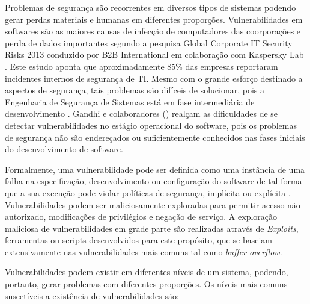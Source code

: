 %

Problemas de segurança são recorrentes em diversos tipos de sistemas podendo gerar perdas materiais e humanas em diferentes proporções. Vulnerabilidades em softwares são as maiores causas de infecção de computadores das coorporações e perda de dados importantes segundo a pesquisa Global Corporate IT Security Risks 2013 conduzido por B2B International em colaboração com Kaspersky Lab \cite{b2binternational2013}. Este estudo aponta que aproximadamente 85\% das empresas reportaram incidentes internos de segurança de TI. Mesmo com o grande esforço destinado a aspectos de segurança, tais problemas são difíceis de solucionar, pois a Engenharia de Segurança de Sistemas está em fase intermediária de desenvolvimento \cite{pascoa2002}. Gandhi e colaboradores (\citeyear{gandhi2013}) realçam as dificuldades de se detectar vulnerabilidades no estágio operacional do software, pois os problemas de segurança não são endereçados ou suficientemente conhecidos nas fases iniciais do desenvolvimento de software. 

%

Formalmente, uma vulnerabilidade pode ser definida como uma instância de uma falha na especificação, desenvolvimento ou configuração do software de tal forma que a sua execução pode violar políticas de segurança, implícita ou explícita \cite{krsul1998}. Vulnerabilidades podem ser maliciosamente exploradas para permitir acesso não autorizado, modificações de privilégios e negação de serviço. A exploração maliciosa de vulnerabilidades em grade parte são realizadas através de \emph{Exploits}, ferramentas ou scripts desenvolvidos para este propósito, que se baseiam extensivamente nas vulnerabilidades mais comuns tal como \emph{buffer-overflow}. 

%

Vulnerabilidades podem existir em diferentes níveis de um sistema, podendo, portanto, gerar problemas com diferentes proporções. Os níveis mais comuns suscetíveis a existência de vulnerabilidades são:

%

